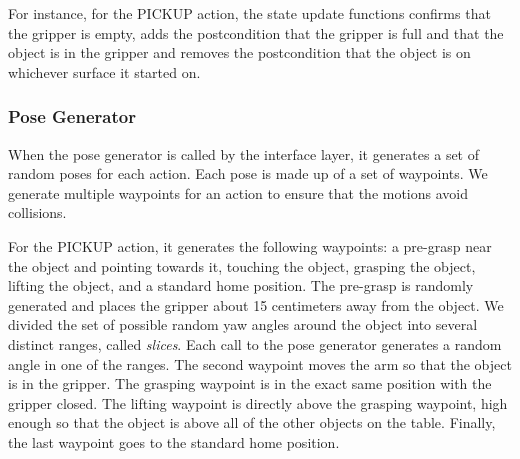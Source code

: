 \documentclass[12pt]{article}
\begin{document}
For instance, for the PICKUP action, the state update functions confirms that the gripper is empty, adds the postcondition that the gripper is full and that the object is in the gripper and removes the postcondition that the object is on whichever surface it started on.


\subsubsection{Pose Generator}

When the pose generator is called by the interface layer, it generates a set of random poses for each action. 
Each pose is made up of a set of waypoints. 
We generate multiple waypoints for an action to ensure that the motions avoid collisions.

For the PICKUP action, it generates the following waypoints: a pre-grasp near the object and pointing towards it, touching the object, grasping the object, lifting the object, and a standard home position. 
The pre-grasp is randomly generated and places the gripper about 15 centimeters away from the object.
We divided the set of possible random yaw angles around the object into several distinct ranges, called \textit{slices}. 
Each call to the pose generator generates a random angle in one of the ranges.
The second waypoint moves the arm so that the object is in the gripper. 
The grasping waypoint is in the exact same position with the gripper closed. 
The lifting waypoint is directly above the grasping waypoint, high enough so that the object is above all of the other objects on the table. 
Finally, the last waypoint goes to the standard home position. 
\end{document}
